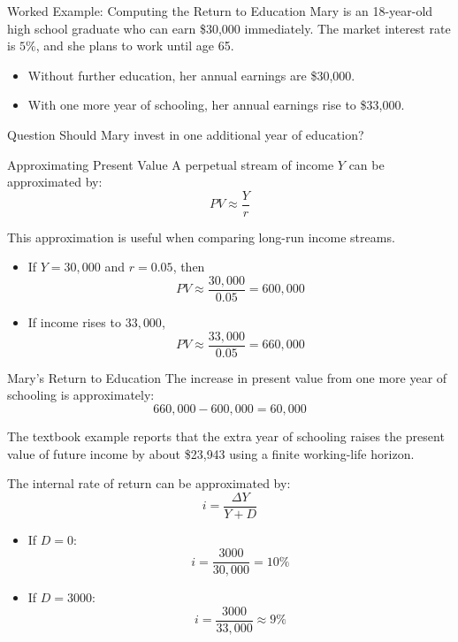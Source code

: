 \documentclass[aspectratio=169]{beamer}
\begin{document}
\begin{frame}{Worked Example: Computing the Return to Education}
\transfade
Mary is an 18-year-old high school graduate who can earn \$30{,}000 immediately.
The market interest rate is \(5\%\), and she plans to work until age 65.
\begin{itemize}
  \item Without further education, her annual earnings are \$30{,}000.
  \item With one more year of schooling, her annual earnings rise to \$33{,}000.
\end{itemize}

\begin{block}{Question}
Should Mary invest in one additional year of education?
\end{block}
\end{frame}

\begin{frame}{Approximating Present Value}
\transfade
A perpetual stream of income \(Y\) can be approximated by:
\[
PV \approx \frac{Y}{r}
\]

This approximation is useful when comparing long-run income streams.

\begin{itemize}
  \item If \(Y = 30{,}000\) and \(r = 0.05\), then
  \[
  PV \approx \frac{30{,}000}{0.05} = 600{,}000
  \]
  \item If income rises to \(33{,}000\),
  \[
  PV \approx \frac{33{,}000}{0.05} = 660{,}000
  \]
\end{itemize}
\end{frame}

\begin{frame}{Mary's Return to Education}
\transfade
The increase in present value from one more year of schooling is approximately:
\[
660{,}000 - 600{,}000 = 60{,}000
\]

The textbook example reports that the extra year of schooling raises the present value of future income by about \$23{,}943 using a finite working-life horizon.

The internal rate of return can be approximated by:
\[
i = \frac{\Delta Y}{Y + D}
\]

\begin{itemize}
  \item If \(D=0\):
  \[
  i = \frac{3000}{30{,}000}=10\%
  \]
  \item If \(D=3000\):
  \[
  i = \frac{3000}{33{,}000}\approx 9\%
  \]
\end{itemize}
\end{frame}
\end{document}
